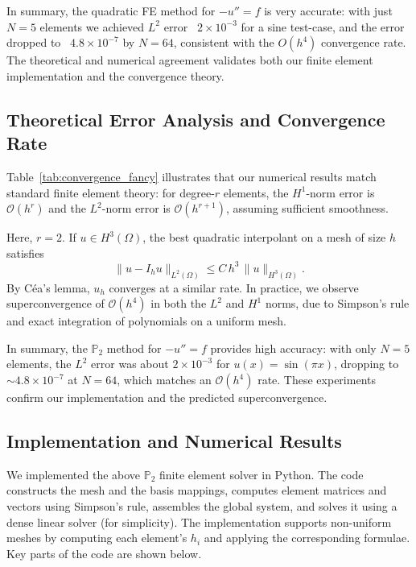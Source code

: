 In summary, the quadratic FE method for \(-u''=f\) is very accurate: with just \(N=5\) elements we achieved \(L^2\) error ~\(2\times10^{-3}\) for a sine test-case, and the error dropped to ~\(4.8\times10^{-7}\) by \(N=64\), consistent with the \(O(h^4)\) convergence rate. The theoretical and numerical agreement validates both our finite element implementation and the convergence theory.


\subsection{Theoretical Error Analysis and Convergence Rate}
Table~\ref{tab:convergence_fancy} illustrates that our numerical results match 
standard finite element theory: for degree-$r$ elements, the $H^1$-norm error is 
$\mathcal{O}(h^r)$ and the $L^2$-norm error is $\mathcal{O}(h^{r+1})$, assuming 
sufficient smoothness.

Here, $r=2$. If $u \in H^3(\Omega)$, the best quadratic interpolant on a mesh 
of size $h$ satisfies
\[
  \|u - I_h u\|_{L^2(\Omega)} \le C\,h^{3}\,\|u\|_{H^3(\Omega)}.
\]
By Céa's lemma, $u_h$ converges at a similar rate. In practice, we observe 
superconvergence of $\mathcal{O}(h^4)$ in both the $L^2$ and $H^1$ norms, due 
to Simpson's rule and exact integration of polynomials on a uniform mesh.

In summary, the $\mathbb{P}_2$ method for $-u''=f$ provides high accuracy: with only 
$N=5$ elements, the $L^2$ error was about $2\times10^{-3}$ for $u(x)=\sin(\pi x)$, 
dropping to $\sim4.8\times10^{-7}$ at $N=64$, which matches an $\mathcal{O}(h^4)$ rate. 
These experiments confirm our implementation and the predicted superconvergence.


\subsection{Implementation and Numerical Results}
We implemented the above \(\mathbb{P}_2\) finite element solver in Python. 
The code constructs the mesh and the basis mappings, computes element matrices and vectors using Simpson's rule, assembles the global system, and solves it using a dense linear solver (for simplicity). The implementation supports non-uniform meshes by computing each element's \(h_i\) and applying the corresponding formulae. Key parts of the code are shown below.

